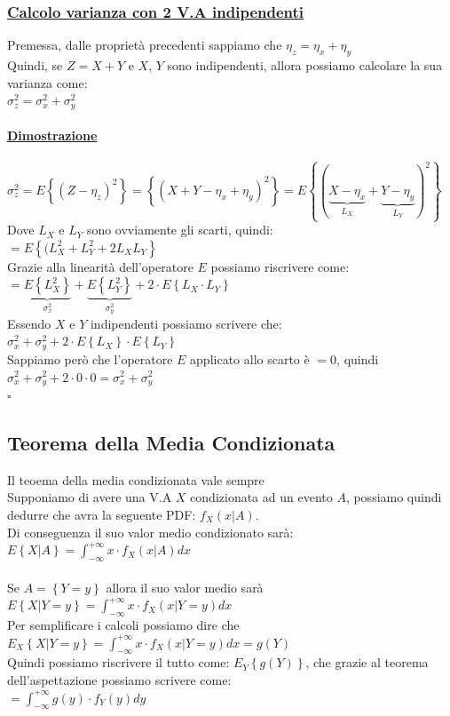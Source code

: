 \documentclass{article}
\begin{document}
\subsubsection{\underline{Calcolo varianza con 2 V.A indipendenti}}
Premessa, dalle proprietà precedenti sappiamo che $\eta_z = \eta_x + \eta_y$ \\
Quindi, se $Z = X + Y$ e $X$, $Y$ sono indipendenti, allora possiamo calcolare la sua varianza come: \\
$\sigma^2_z = \sigma^2_x + \sigma^2_y$
\paragraph{\underline{Dimostrazione}}
$\sigma^2_z = E \left\{ (Z - \eta_z)^2 \right\} = \left\{ (X + Y - \eta_x + \eta_y)^2 \right\} = E\left\{ (\underset{L_X}{\underbrace{X - \eta_x}} + \underset{L_Y}{\underbrace{Y - \eta_y}})^2 \right\}$ \\
Dove $L_X$ e $L_Y$ sono ovviamente gli scarti, quindi: \\
$= E\left\{ (L^2_X + L^2_Y + 2 L_X L_Y \right\}$ \\
Grazie alla linearità dell'operatore $E$ possiamo riscrivere come: \\
$= \underset{\sigma^2_x}{\underbrace{E\left\{ L^2_X \right\}}} + \underset{\sigma^2_y}{\underbrace{E\left\{ L^2_Y \right\}}} + 2 \cdot E\left\{ L_X \cdot L_Y \right\}$ \\
Essendo $X$ e $Y$ indipendenti possiamo scrivere che: \\
$\sigma^2_x + \sigma^2_y + 2 \cdot E\left\{ L_X \right\} \cdot E\left\{ L_Y \right\}$ \\
Sappiamo però che l'operatore $E$ applicato allo scarto è $= 0$, quindi \\
$\sigma^2_x + \sigma^2_y + 2 \cdot 0 \cdot 0 = \sigma^2_x + \sigma^2_y$ \\
\hspace*{0pt}\hfill $\square$

\subsection{Teorema della Media Condizionata}
Il teoema della media condizionata vale sempre \\
Supponiamo di avere una V.A $X$ condizionata ad un evento $A$, possiamo quindi dedurre che avra la seguente PDF: $f_X(x|A)$. \\
Di conseguenza il suo valor medio condizionato sarà: $E \left\{X | A \right\} = \int_{-\infty}^{+\infty} x \cdot f_X(x|A) dx$ \\ \\
Se $A = \left\{ Y = y \right\}$ allora il suo valor medio sarà $E \left\{X | Y = y \right\} = \int_{-\infty}^{+\infty} x \cdot f_X(x|Y = y) dx$ \\
Per semplificare i calcoli possiamo dire che $E_X \left\{X | Y = y \right\} = \int_{-\infty}^{+\infty} x \cdot f_X(x|Y = y) dx = g(Y)$ \\
Quindi possiamo riscrivere il tutto come: $E_Y \left\{ g(Y)\right\}$, che grazie al teorema dell'aspettazione possiamo scrivere come: \\
$= \int_{-\infty}^{+\infty} g(y) \cdot f_Y(y) dy$ 
\end{document}
